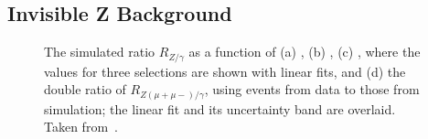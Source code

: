 \subsection{Invisible Z Background}
\label{subsec:RA2_Zinv}
\begin{figure}[!t]
  \centering
{}
  \caption{The simulated ratio $R_{Z/\gamma}$ as a function of (a) \MHT, (b) \HT, (c) \NJets, where the values for three \MHT selections are shown with linear fits, and (d) the double ratio of $R_{Z(\mu+\mu-)/\gamma}$, using events from data to those from simulation; the linear fit and its uncertainty band are overlaid. Taken from~\cite{Chatrchyan:2014lfa}.}
  \label{fig:ra2_zinv}
\end{figure}

